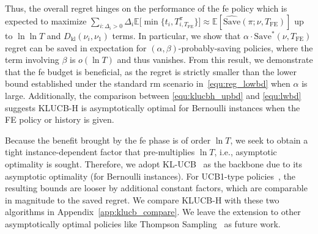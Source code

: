 \documentclass[twoside,11pt]{article}
\newcommand{\kl}{D_{\mathrm{kl}}}
\newcommand{\bbE}{\mathbb{E}}
\newcommand{\Tfe}{T_{\mathrm{FE}}}
\newcommand{\Saved}{\mathrm{Save}}
\newcommand{\FE}{\textrm{FE}}
\newcommand{\klucbh}{\textsc{KLUCB-H}}
\begin{document}
Thus, the overall regret hinges on the performance of the \ac{fe} policy which is expected to maximize $\sum_{i:\Delta_i>0} \Delta_i \bbE\big[\min\{t_i,T_{i,\Tfe}^\pi\} \big]\approx \bbE[\widehat{\Saved}(\pi;\nu,\Tfe)]$ up to $\ln\ln T$ and $\kl(\nu_i,\nu_1)$ terms.
In particular, we show that $\alpha\cdot \Saved^*(\nu,\Tfe) $ regret can be saved in expectation for $(\alpha,\beta)$-probably-saving policies, where the term involving $\beta$ is $o(\ln T)$ and thus vanishes.
From this result, we demonstrate that the \ac{fe} budget is beneficial, as the regret is strictly smaller than the lower bound established under the standard \ac{rm} scenario in~\eqref{equ:reg_lowbd} when $\alpha$ is  large.
Additionally, the comparison between \eqref{equ:klucbh_upbd} and \eqref{equ:lwbd} suggests \klucbh{} is asymptotically optimal for Bernoulli instances when the \FE{} policy or history is given.

\begin{remark}
    Because the benefit brought by the \ac{fe} phase is of order $\ln T$, we seek to obtain a tight instance-dependent factor that pre-multiplies $\ln T$, i.e., asymptotic optimality is sought. 
    Therefore, we adopt KL-UCB~\citep{garivier2011KLUCB} as the backbone due to its asymptotic optimality (for Bernoulli instances).
    For UCB1-type policies~\citep{auer2002finite,shivaswamy2012multi,cheung2024leveraging}, the resulting bounds are looser by additional constant factors, which are comparable in magnitude to the saved regret. %
    We compare \klucbh{} with these two algorithms in Appendix~\ref{app:klucb_compare}. We leave the extension to other asymptotically optimal policies like Thompson Sampling~\citep{agrawal2017near} as future work.
\end{remark}
\end{document}
